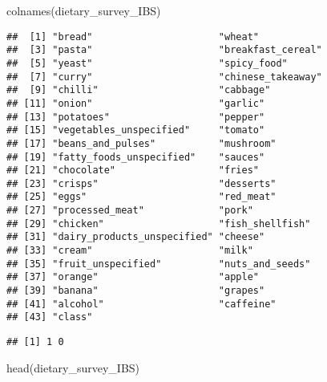 \documentclass[
]{article}
\newenvironment{Shaded}{\begin{snugshade}}{\end{snugshade}}
\newcommand{\FunctionTok}[1]{\textcolor[rgb]{0.00,0.00,0.00}{#1}}
\newcommand{\NormalTok}[1]{#1}
\newcommand{\SpecialCharTok}[1]{\textcolor[rgb]{0.00,0.00,0.00}{#1}}
\begin{document}
\begin{Shaded}
\begin{Highlighting}[]
\FunctionTok{colnames}\NormalTok{(dietary\_survey\_IBS)}
\end{Highlighting}
\end{Shaded}

\begin{verbatim}
##  [1] "bread"                      "wheat"                     
##  [3] "pasta"                      "breakfast_cereal"          
##  [5] "yeast"                      "spicy_food"                
##  [7] "curry"                      "chinese_takeaway"          
##  [9] "chilli"                     "cabbage"                   
## [11] "onion"                      "garlic"                    
## [13] "potatoes"                   "pepper"                    
## [15] "vegetables_unspecified"     "tomato"                    
## [17] "beans_and_pulses"           "mushroom"                  
## [19] "fatty_foods_unspecified"    "sauces"                    
## [21] "chocolate"                  "fries"                     
## [23] "crisps"                     "desserts"                  
## [25] "eggs"                       "red_meat"                  
## [27] "processed_meat"             "pork"                      
## [29] "chicken"                    "fish_shellfish"            
## [31] "dairy_products_unspecified" "cheese"                    
## [33] "cream"                      "milk"                      
## [35] "fruit_unspecified"          "nuts_and_seeds"            
## [37] "orange"                     "apple"                     
## [39] "banana"                     "grapes"                    
## [41] "alcohol"                    "caffeine"                  
## [43] "class"
\end{verbatim}

\begin{Shaded}
\end{Shaded}

\begin{verbatim}
## [1] 1 0
\end{verbatim}

\begin{Shaded}
\begin{Highlighting}[]
\FunctionTok{head}\NormalTok{(dietary\_survey\_IBS)}
\end{Highlighting}
\end{Shaded}
\end{document}
